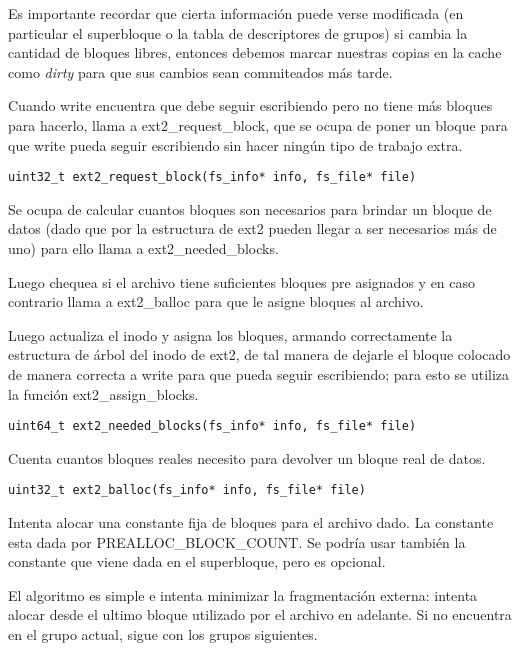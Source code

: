 Es importante recordar que cierta información puede verse modificada (en particular el superbloque o la tabla de descriptores de grupos) si cambia la cantidad de bloques libres, entonces debemos marcar nuestras copias en la cache como \emph{dirty} para que sus cambios sean commiteados más tarde.

Cuando write encuentra que debe seguir escribiendo pero no tiene más bloques para hacerlo, llama a ext2\_request\_block, que se ocupa de poner un bloque para que write pueda seguir escribiendo sin hacer ningún tipo de trabajo extra.

\begin{lstlisting}[style=customc]
uint32_t ext2_request_block(fs_info* info, fs_file* file)
\end{lstlisting}

Se ocupa de calcular cuantos bloques son necesarios para brindar un bloque de datos (dado que por la estructura de ext2 pueden llegar a ser necesarios más de uno) para ello llama a ext2\_needed\_blocks.

Luego chequea si el archivo tiene suficientes bloques pre asignados y en caso contrario llama a ext2\_balloc para que le asigne bloques al archivo.

Luego actualiza el inodo y asigna los bloques, armando correctamente la estructura de árbol del inodo de ext2, de tal manera de dejarle el bloque colocado de manera correcta a write para que pueda seguir escribiendo; para esto se utiliza la función ext2\_assign\_blocks.


\begin{lstlisting}[style=customc]
uint64_t ext2_needed_blocks(fs_info* info, fs_file* file)
\end{lstlisting}

Cuenta cuantos bloques reales necesito para devolver un bloque real de datos.


\begin{lstlisting}[style=customc]
uint32_t ext2_balloc(fs_info* info, fs_file* file)
\end{lstlisting}

Intenta alocar una constante fija de bloques para el archivo dado. La constante esta dada por PREALLOC\_BLOCK\_COUNT. Se podría usar también la constante que viene dada en el superbloque, pero es opcional.

El algoritmo es simple  e intenta minimizar la fragmentación externa: intenta alocar desde el ultimo bloque utilizado por el archivo en adelante. Si no encuentra en el grupo actual, sigue con los grupos siguientes.

